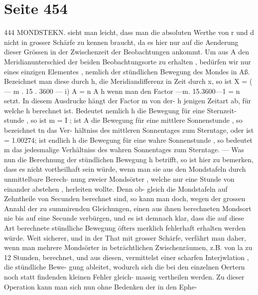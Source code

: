 \documentclass[10pt,a4paper]{article}
\begin{document}
\newpage
\section*{Seite 454}

444  MONDSTEKN.
sieht  man  leicht,  dass  man  die  absoluten  Werthe  von  r  und  d  nicht  in  grosser  Schärfe  zu  kennen
braucht,  da  es  hier  nur  auf  die  Aenderung  dieser  Grössen  in  der  Zwischenzeit  der  Beobachtungen  ankommt.
Um  aus  A  den  Meridianunterschied  der  beiden  Beobachtungsorte  zu  erhalten ,  bedürfen  wir  nur
eines  einzigen  Elementes ,  nemlich  der  stündlichen  Bewegung  des  Mondes  in  Aß.  Bezeichnet  man  diese
durch   h,   die  Meridiandifferenz  in  Zeit  durch   x,    so  ist
X  =  ( ---  m .  15 .  3600  ---  i)  A  =  n  A
h
wenn  man  den  Factor    ---m.  15.3600---1  =  n    setzt.    In  diesem  Ausdrucke  hängt  der  Factor  m  von  der-
h
jenigen  Zeitart  ab,  für  welche  h  berechnet  ist.  Bedeutet  nemlich  h  die  Bewegung  für  eine  Sternzeit-
stunde ,  so  ist  m  =  I ;  ist  A  die  Bewegung  für  eine  mittlere  Sonnenstunde ,  so  bezeichnet  tn  das  Ver-
hältniss  des  mittleren  Sonnentages  zum  Sterntage,  oder  ist  =  1.00274;  ist  endlich  h  die  Bewegung  für
eine  wahre  Sonnenstunde ,  so  bedeutet  m  das  jedesmalige  Verhältniss  des  wahren  Sonnentages  zum
Sterntage.  ---  Was  nun  die  Berechnung  der  stündlichen  Bewegung  h  betrifft,  so  ist  hier  zu  bemerken,
dass  es  nicht  vortheilhaft  sein  würde,  wenn  man  sie  aus  den  Mondstafeln  durch  unmittelbare  Berech-
nung zweier  Mondsörter ,  welche  nur  eine  Stunde  von  einander  abstehen ,  herleiten  wollte.  Denn  ob-
gleich die  Mondstafeln  auf  Zehntheile  von  Secunden  berechnet  sind,  so  kann  man  doch,  wegen  der
grossen  Anzahl  der  zu  summirenden  Gleichungen,  einen  aus  ihnen  berechneten  Mondsort  nie  bis  auf  eine
Secunde  verbürgen,  und  es  ist  demnach  klar,  dass  die  auf  diese  Art  berechnete  stündliche  Bewegung
öfters  merklich  fehlerhaft  erhalten  werden  würde.  Weit  sicherer,  und  in  der  That  mit  grosser  Schärfe,
verfährt  man  daher,  wenn  man  mehrere  Mondsörter  in  beträchtlichen  Zwischenräumen,  z.B.  von  la  zu
12  Stunden,  berechnet,  und  aus  diesen,  vermittelst  einer  scharfen  Interjwlation ,  die  stündliche  Bewe-
gung ableitet,  wodurch  sich  die  bei  den  einzelnen  Oertern  noch  statt  findenden  kleinen  Fehler  gleich-
massig  vertheilen  werden.  Zu  dieser  Operation  kann  man  sich  nun  ohne  Bedenken  der  in  den  Ephe-
\end{document}
